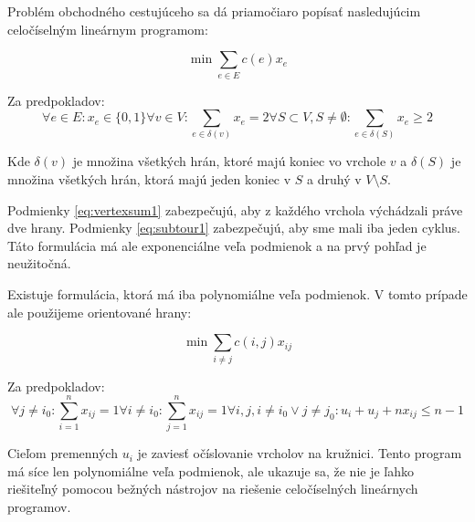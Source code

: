 Problém obchodného cestujúceho sa dá priamočiaro popísať nasledujúcim celočíselným lineárnym
programom:

$$\min \sum_{e \in E} c(e) x_e$$ 

Za predpokladov:
\begin{subequations}
\begin{equation}\forall e \in E: x_e \in \{0, 1\} \label{eq:enum}\end{equation}
\begin{equation}\forall v \in V: \sum_{e \in \delta(v)} x_e = 2 \label{eq:vertexsum1} \end{equation}
\begin{equation}\forall S \subset V, S \neq \emptyset: \sum_{e \in \delta(S)} x_e \geq 2 \label{eq:subtour1}\end{equation}
\end{subequations}

Kde $\delta(v)$ je množina všetkých hrán, ktoré majú koniec vo vrchole $v$ a
$\delta(S)$ je množina všetkých hrán, ktorá majú jeden koniec v $S$ a druhý v $V \setminus S$.

Podmienky \eqref{eq:vertexsum1} zabezpečujú, aby z každého vrchola výchádzali práve
dve hrany. Podmienky \eqref{eq:subtour1} zabezpečujú, aby sme mali iba jeden cyklus.
Táto formulácia má ale exponenciálne veľa podmienok a na prvý pohľad je neužitočná.

Existuje formulácia, ktorá má iba polynomiálne veľa podmienok. V tomto prípade
ale použijeme orientované hrany:

$$\min \sum_{i\neq j} c(i,j) x_{ij}$$

Za predpokladov:
\begin{subequations}
\begin{equation}\forall j \neq i_0: \sum_{i=1}^n x_{ij} = 1\end{equation}
\begin{equation}\forall i \neq i_0: \sum_{j=1}^n x_{ij} = 1\end{equation}
\begin{equation}\forall i,j, i \neq i_0 \vee j \neq j_0: u_i + u_j + nx_{ij} \leq n-1\end{equation}
\end{subequations}

Cieľom premenných $u_i$ je zaviesť očíslovanie vrcholov na kružnici. Tento program
má síce len polynomiálne veľa podmienok, ale ukazuje sa, že nie je ľahko riešiteľný
pomocou bežných nástrojov na riešenie celočíselných lineárnych programov.

